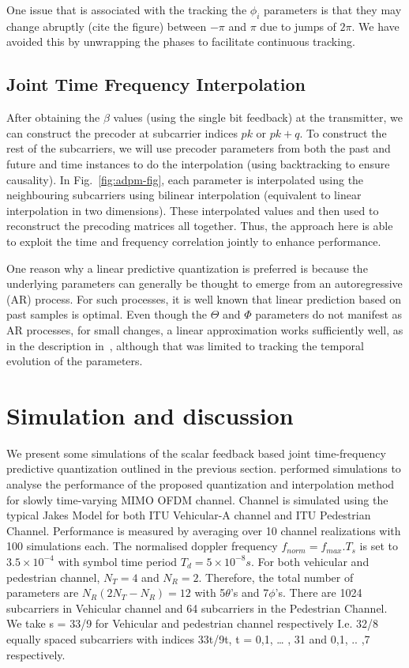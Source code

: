 \documentclass[conference]{IEEEtran}
\begin{document}
One issue that is associated with the tracking the $\phi_i$ parameters
is that they may change abruptly (cite the figure) between $-\pi$ and
$\pi$ due to jumps of $2\pi$. We have avoided this by unwrapping the
phases to facilitate continuous tracking.
\subsection{Joint Time Frequency Interpolation}
\label{interp}
After obtaining the $\beta$ values (using the single bit feedback) at
the transmitter, we can construct the precoder at subcarrier indices
$pk$ or $pk+q$. To construct the rest of the subcarriers, we will use
precoder parameters from both the past and future and time instances
to do the interpolation (using backtracking to ensure causality). In
Fig.~\ref{fig:adpm-fig}, each parameter is interpolated using the
neighbouring subcarriers using bilinear interpolation (equivalent to
linear interpolation in two dimensions). These interpolated values and
then used to reconstruct the precoding matrices all together. Thus,
the approach here is able to exploit the time and frequency
correlation jointly to enhance performance.

One reason why a linear predictive quantization is preferred is
because the underlying parameters can generally be thought to emerge
from an autoregressive (AR) process. For such processes, it is well known
that linear prediction based on past samples is optimal. Even though
the $\Theta$ and $\Phi$ parameters do not manifest as AR processes,
for small changes, a linear approximation works sufficiently
well, as in the description in~\cite{4114278}, although that was
limited to tracking the temporal evolution of the parameters.

\section{Simulation and discussion}
\label{section3}
We present some simulations of the scalar feedback based joint
time-frequency predictive quantization outlined in the previous section. performed simulations to analyse the performance of the proposed quantization and interpolation method for slowly time-varying MIMO OFDM channel. Channel is simulated using the typical Jakes Model for both ITU Vehicular-A channel and ITU Pedestrian Channel. Performance is measured by averaging over 10 channel realizations with 100 simulations each. The normalised doppler frequency $f_{norm} = f_{max}.T_s$ is set to $3.5\times10^{-4}$ with symbol time period $T_d = 5\times10^{-8} s$. For both vehicular and pedestrian channel, $N_T=4$ and $N_R=2$. Therefore, the total number of parameters are $N_{R}(2N_{T} - N_{R}) = 12$ with 5$\theta$’s and 7$\phi$’s. There are 1024 subcarriers in Vehicular channel and 64 subcarriers in the Pedestrian Channel. We take s = 33/9 for Vehicular and pedestrian channel respectively I.e. 32/8 equally spaced subcarriers with indices 33t/9t, t = 0,1, … , 31 and 0,1, .. ,7 respectively.
\end{document}
